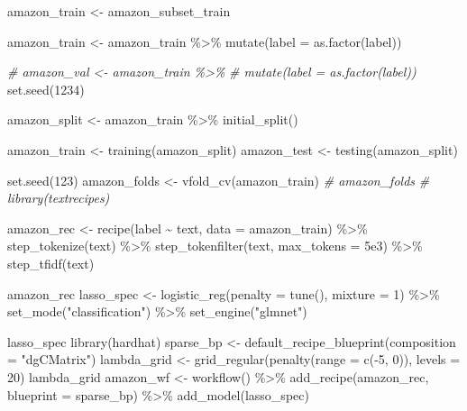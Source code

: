 \documentclass[
]{article}
\newenvironment{Shaded}{}{}
\newcommand{\AttributeTok}[1]{\textcolor[rgb]{0.49,0.56,0.16}{#1}}
\newcommand{\CommentTok}[1]{\textcolor[rgb]{0.38,0.63,0.69}{\textit{#1}}}
\newcommand{\DecValTok}[1]{\textcolor[rgb]{0.25,0.63,0.44}{#1}}
\newcommand{\FloatTok}[1]{\textcolor[rgb]{0.25,0.63,0.44}{#1}}
\newcommand{\FunctionTok}[1]{\textcolor[rgb]{0.02,0.16,0.49}{#1}}
\newcommand{\NormalTok}[1]{#1}
\newcommand{\OtherTok}[1]{\textcolor[rgb]{0.00,0.44,0.13}{#1}}
\newcommand{\SpecialCharTok}[1]{\textcolor[rgb]{0.25,0.44,0.63}{#1}}
\newcommand{\StringTok}[1]{\textcolor[rgb]{0.25,0.44,0.63}{#1}}
\begin{document}
\begin{Shaded}
\begin{Highlighting}[]
\NormalTok{amazon\_train }\OtherTok{\textless{}{-}}\NormalTok{ amazon\_subset\_train}

\NormalTok{amazon\_train }\OtherTok{\textless{}{-}}\NormalTok{ amazon\_train }\SpecialCharTok{\%\textgreater{}\%}
  \FunctionTok{mutate}\NormalTok{(}\AttributeTok{label =} \FunctionTok{as.factor}\NormalTok{(label))}

\CommentTok{\# amazon\_val \textless{}{-} amazon\_train \%\textgreater{}\%}
\CommentTok{\#   mutate(label = as.factor(label))}
\FunctionTok{set.seed}\NormalTok{(}\DecValTok{1234}\NormalTok{)}

\NormalTok{amazon\_split }\OtherTok{\textless{}{-}}\NormalTok{ amazon\_train }\SpecialCharTok{\%\textgreater{}\%} \FunctionTok{initial\_split}\NormalTok{()}

\NormalTok{amazon\_train }\OtherTok{\textless{}{-}} \FunctionTok{training}\NormalTok{(amazon\_split)}
\NormalTok{amazon\_test }\OtherTok{\textless{}{-}} \FunctionTok{testing}\NormalTok{(amazon\_split)}

\FunctionTok{set.seed}\NormalTok{(}\DecValTok{123}\NormalTok{)}
\NormalTok{amazon\_folds }\OtherTok{\textless{}{-}} \FunctionTok{vfold\_cv}\NormalTok{(amazon\_train)}
\CommentTok{\# amazon\_folds}
\CommentTok{\# library(textrecipes)}

\NormalTok{amazon\_rec }\OtherTok{\textless{}{-}} \FunctionTok{recipe}\NormalTok{(label }\SpecialCharTok{\textasciitilde{}}\NormalTok{ text, }\AttributeTok{data =}\NormalTok{ amazon\_train) }\SpecialCharTok{\%\textgreater{}\%}
  \FunctionTok{step\_tokenize}\NormalTok{(text) }\SpecialCharTok{\%\textgreater{}\%}
  \FunctionTok{step\_tokenfilter}\NormalTok{(text, }\AttributeTok{max\_tokens =} \FloatTok{5e3}\NormalTok{) }\SpecialCharTok{\%\textgreater{}\%}
  \FunctionTok{step\_tfidf}\NormalTok{(text)}

\NormalTok{amazon\_rec}
\NormalTok{lasso\_spec }\OtherTok{\textless{}{-}} \FunctionTok{logistic\_reg}\NormalTok{(}\AttributeTok{penalty =} \FunctionTok{tune}\NormalTok{(), }\AttributeTok{mixture =} \DecValTok{1}\NormalTok{) }\SpecialCharTok{\%\textgreater{}\%}
  \FunctionTok{set\_mode}\NormalTok{(}\StringTok{"classification"}\NormalTok{) }\SpecialCharTok{\%\textgreater{}\%}
  \FunctionTok{set\_engine}\NormalTok{(}\StringTok{"glmnet"}\NormalTok{)}

\NormalTok{lasso\_spec}
\FunctionTok{library}\NormalTok{(hardhat)}
\NormalTok{sparse\_bp }\OtherTok{\textless{}{-}} \FunctionTok{default\_recipe\_blueprint}\NormalTok{(}\AttributeTok{composition =} \StringTok{"dgCMatrix"}\NormalTok{)}
\NormalTok{lambda\_grid }\OtherTok{\textless{}{-}} \FunctionTok{grid\_regular}\NormalTok{(}\FunctionTok{penalty}\NormalTok{(}\AttributeTok{range =} \FunctionTok{c}\NormalTok{(}\SpecialCharTok{{-}}\DecValTok{5}\NormalTok{, }\DecValTok{0}\NormalTok{)), }\AttributeTok{levels =} \DecValTok{20}\NormalTok{)}
\NormalTok{lambda\_grid}
\NormalTok{amazon\_wf }\OtherTok{\textless{}{-}} \FunctionTok{workflow}\NormalTok{() }\SpecialCharTok{\%\textgreater{}\%}
  \FunctionTok{add\_recipe}\NormalTok{(amazon\_rec, }\AttributeTok{blueprint =}\NormalTok{ sparse\_bp) }\SpecialCharTok{\%\textgreater{}\%}
  \FunctionTok{add\_model}\NormalTok{(lasso\_spec)}


\end{Highlighting}
\end{Shaded}
\end{document}
